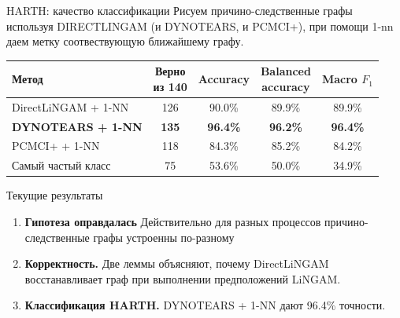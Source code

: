 \documentclass[aspectratio=169]{beamer}
\begin{document}
\begin{frame}{HARTH: качество классификации}
    \small Рисуем причино-следственные графы используя DIRECTLINGAM (и DYNOTEARS, и PCMCI+), при помощи 1-nn даем метку соотвествующую ближайшему графу.
    \par\medskip
    \centering
    \renewcommand{\arraystretch}{1.28}
    \setlength{\tabcolsep}{7pt}
    \begin{tabular}{lcccc}
        \toprule
        Метод & \shortstack{Верно\\из 140} & Accuracy & \shortstack{Balanced\\accuracy} & Macro $F_1$\\
        \midrule
        DirectLiNGAM + 1-NN      & 126 & 90.0\% & 89.9\% & 89.9\%\\
        \textbf{DYNOTEARS + 1-NN} & \textbf{135} & \textbf{96.4\%} & \textbf{96.2\%} & \textbf{96.4\%}\\
        PCMCI+ + 1-NN        & 118 & 84.3\% & 85.2\% & 84.2\%\\
        Самый частый класс    & 75  & 53.6\% & 50.0\% & 34.9\%\\
        \bottomrule
    \end{tabular}
    \par\medskip\raggedright\normalsize
\end{frame}

\begin{frame}{Текущие результаты}
    \begin{enumerate}
        \item \textbf{Гипотеза оправдалась}
        Действительно для разных процессов причино-следственные графы устроенны по-разному
        \item \textbf{Корректность.} Две леммы объясняют, почему DirectLiNGAM
        восстанавливает граф при выполнении предположений LiNGAM.
        \item \textbf{Классификация HARTH.} DYNOTEARS + 1-NN дают 96.4\% точности.
    \end{enumerate}
\end{frame}
\end{document}
